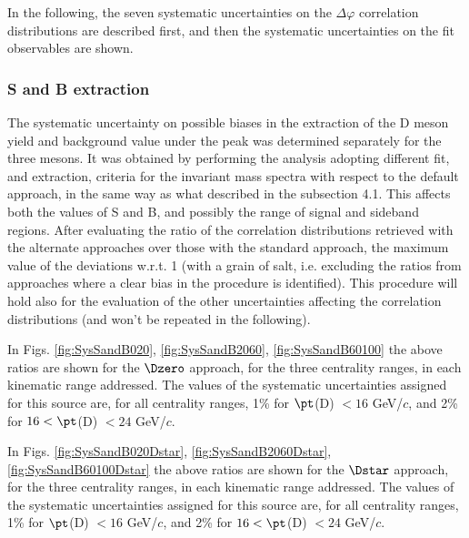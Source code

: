 In the following, the seven systematic uncertainties on the $\Delta\varphi$ correlation distributions are described first, and then the systematic uncertainties on the fit observables are shown.

\subsubsection{S and B extraction}
The systematic uncertainty on possible biases in the extraction of the D meson yield and background value under the peak was determined separately for the three mesons. It was obtained by performing the analysis adopting different fit, and extraction, criteria for the invariant mass spectra with respect to the default approach, in the same way as what described in the subsection 4.1. This affects both the values of S and B, and possibly the range of signal and sideband regions.
After evaluating the ratio of the correlation distributions retrieved with the alternate approaches over those with the standard approach, the maximum value of the deviations w.r.t. 1 (with a grain of salt, i.e. excluding the ratios from approaches where a clear bias in the procedure is identified).
This procedure will hold also for the evaluation of the other uncertainties affecting the correlation distributions (and won't be repeated in the following).

In Figs. \ref{fig:SysSandB020}, \ref{fig:SysSandB2060}, \ref{fig:SysSandB60100} the above ratios are shown for the $\Dzero$ approach, for the three centrality ranges, in each kinematic range addressed. The values of the systematic uncertainties assigned for this source are, for all centrality ranges, 1\% for $\pt$(D) $< 16$ GeV/$c$, and 2\% for $16 < \pt$(D) $< 24$ GeV/$c$.

In Figs. \ref{fig:SysSandB020Dstar}, \ref{fig:SysSandB2060Dstar}, \ref{fig:SysSandB60100Dstar} the above ratios are shown for the $\Dstar$ approach, for the three centrality ranges, in each kinematic range addressed. The values of the systematic uncertainties assigned for this source are, for all centrality ranges, 1\% for $\pt$(D) $< 16$ GeV/$c$, and 2\% for $16 < \pt$(D) $< 24$ GeV/$c$.

